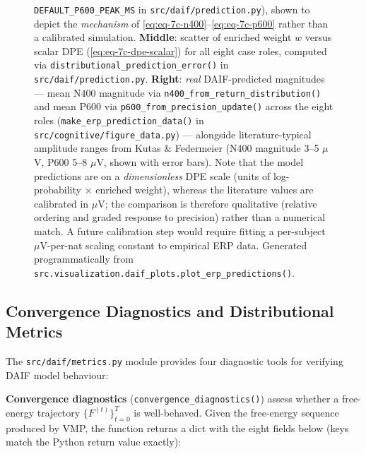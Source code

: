 \documentclass[
]{article}
\begin{document}
\begin{figure}
{\protect\texttt{DEFAULT\_P600\_PEAK\_MS} in
\protect\texttt{src/daif/prediction.py}), shown to depict the
\emph{mechanism} of \autoref{eq:eq-7c-n400}--\autoref{eq:eq-7c-p600}
rather than a calibrated simulation. \textbf{Middle}: scatter of
enriched weight \(w\) versus scalar DPE (\autoref{eq:eq-7c-dpe-scalar})
for all eight case roles, computed via
\protect\texttt{distributional\_prediction\_error()} in
\protect\texttt{src/daif/prediction.py}. \textbf{Right}: \emph{real}
DAIF-predicted magnitudes --- mean N400 magnitude via
\protect\texttt{n400\_from\_return\_distribution()} and mean P600 via
\protect\texttt{p600\_from\_precision\_update()} across the eight roles
(\protect\texttt{make\_erp\_prediction\_data()} in
\protect\texttt{src/cognitive/figure\_data.py}) --- alongside
literature-typical amplitude ranges from Kutas \& Federmeier
\citeyearpar{kutas2011thirty} (N400 magnitude 3--5 \texorpdfstring{\ensuremath{\mu}}{mu}V, P600 5--8 \texorpdfstring{\ensuremath{\mu}}{mu}V,
shown with error bars). Note that the model predictions are on a
\emph{dimensionless} DPE scale (units of log-probability \texorpdfstring{\ensuremath{\times}}{x} enriched
weight), whereas the literature values are calibrated in \texorpdfstring{\ensuremath{\mu}}{mu}V; the
comparison is therefore qualitative (relative ordering and graded
response to precision) rather than a numerical match. A future
calibration step would require fitting a per-subject \texorpdfstring{\ensuremath{\mu}}{mu}V-per-nat scaling
constant to empirical ERP data. Generated programmatically from
\protect\texttt{src.visualization.daif\_plots.plot\_erp\_predictions()}.}\label{fig:daif-erp-predictions}
\end{figure}

\subsection{Convergence Diagnostics and Distributional
Metrics}\label{sec:daif-metrics}

The \texttt{src/daif/metrics.py} module provides four diagnostic tools
for verifying DAIF model behaviour:

\textbf{Convergence diagnostics} (\texttt{convergence\_diagnostics()})
assess whether a free-energy trajectory \(\{F^{(t)}\}_{t=0}^{T}\) is
well-behaved. Given the free-energy sequence produced by VMP, the
function returns a dict with the eight fields below (keys match the
Python return value exactly):
\end{document}
